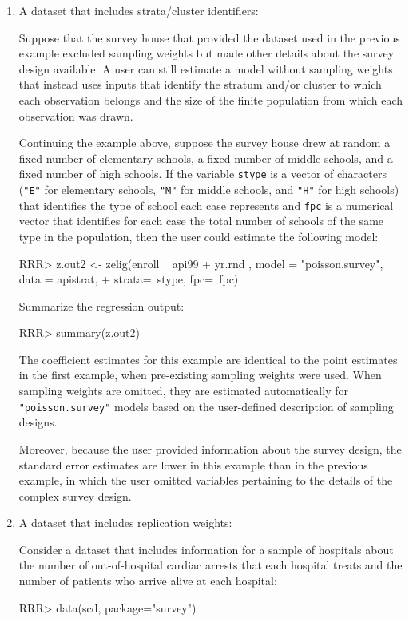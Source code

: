 \begin{enumerate}
\item  A dataset that includes strata/cluster identifiers:

Suppose that the survey house that provided the dataset used in the
previous example excluded sampling weights but made other details
about the survey design available.  A user can still estimate a model
without sampling weights that instead uses inputs that identify the
stratum and/or cluster to which each observation belongs and the
size of the finite population from which each observation was drawn.

Continuing the example above, suppose the survey house drew at
random a fixed number of elementary schools, a fixed number of
middle schools, and a fixed number of high schools. If the variable
{\tt stype} is a vector of characters ({\tt "E"} for elementary
schools, {\tt "M"} for middle schools, and {\tt "H"} for high schools)
that identifies the type of school each case
represents and {\tt fpc} is a numerical vector that identifies for
each case the total number of schools of the same type in the
population, then the user could estimate the following model:

\begin{Schunk}
\begin{Sinput}
RRR> z.out2 <- zelig(enroll ~ api99 + yr.rnd , model = "poisson.survey", data = apistrat, 
+   strata=~stype, fpc=~fpc)
\end{Sinput}
\end{Schunk}
Summarize the regression output:
\begin{Schunk}
\begin{Sinput}
RRR> summary(z.out2) 
\end{Sinput}
\end{Schunk}
The coefficient estimates for this example are
identical to the point estimates in the first example, when
pre-existing sampling weights were used.  When sampling weights are
omitted, they are estimated automatically for {\tt "poisson.survey"}
models based on the user-defined description of sampling designs. 

Moreover, because the user provided information about the survey
design, the standard error estimates are lower in this example than
in the previous example, in which the user omitted variables pertaining
to the details of the complex survey design.

\item A dataset that includes replication weights:

Consider a dataset that includes information for a sample of hospitals
about the number of out-of-hospital cardiac arrests that each
hospital treats and the number of patients who arrive alive
at each hospital: 
\begin{Schunk}
\begin{Sinput}
RRR> data(scd, package="survey") 
\end{Sinput}
\end{Schunk}


\end{enumerate}
